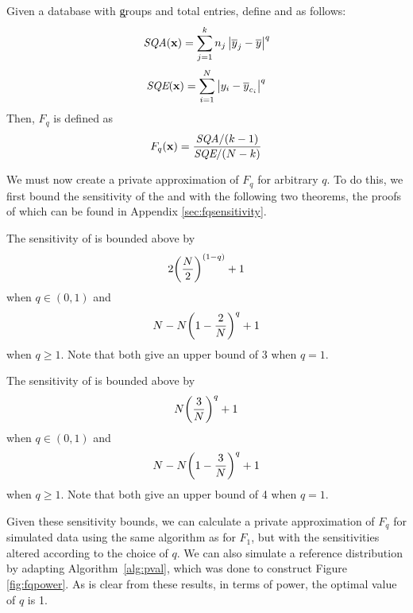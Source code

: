 \begin{definition}[$F_q$] \label{def:Fq} 
Given a database \x with \k groups and \dbsize total entries, define \sqa and \sqe as follows:
%
\begin{equation*}
\textit{SQA}(\mathbf{x}) = \sum_{j=1}^k n_j \left\vert \overline{y}_j - \overline{y} \right\vert^q
\end{equation*}
%
\begin{equation*}
\textit{SQE}(\mathbf{x}) = \sum_{i=1}^N \left\vert y_i - \overline{y}_{c_i} \right\vert^q
\end{equation*}
%
Then, $F_q$ is defined as
%
\begin{equation*}
F_q(\mathbf{x}) = \frac{\textit{SQA}/(k-1)}{\textit{SQE}/(N-k)}
\end{equation*}
%
\end{definition}
We must now create a private approximation of $F_q$ for arbitrary $q$.  To do this, we first bound the sensitivity of the \sqa and \sqe with the following two theorems, the proofs of which can be found in Appendix \ref{sec:fqsensitivity}.
\begin{theorem} \label{thm:SQEsens} 
The sensitivity of \sqe is bounded above by
\begin{equation*}
2\bigg(\frac{N}{2}\bigg)^{(1-q)} + 1
\end{equation*}
when $q \in (0,1)$ and
\begin{equation*}
N - N\bigg(1-\frac{2}{N}\bigg)^q +1 
\end{equation*}
when $q\geq 1$. Note that both give an upper bound of 3 when $q=1$.
\end{theorem}


\begin{theorem}\label{thm:SQAsens} The sensitivity of \sqa is bounded above by 
\begin{equation*}
N\bigg(\frac{3}{N}\bigg)^q + 1
\end{equation*}
when $q \in (0,1)$ and
\begin{equation*}
N-N\bigg(1-\frac{3}{N}\bigg)^q + 1
\end{equation*}
when $q \geq 1$. Note that both give an upper bound of 4 when $q = 1$.
\end{theorem}


Given these sensitivity bounds, we can calculate a private approximation of $F_q$ for simulated data using the same algorithm as for $F_1$, but with the sensitivities altered according to the choice of $q$.  We can also simulate a reference distribution by adapting Algorithm~\ref{alg:pval}, which was done to construct Figure \ref{fig:fqpower}.  As is clear from these results, in terms of power, the optimal value of $q$ is 1.

